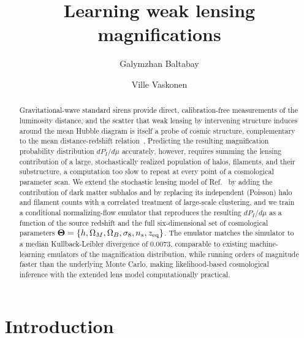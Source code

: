 \documentclass[aps,prd,10pt,nofootinbib,twocolumn,superscriptaddress,floatfix,notitlepage]{revtex4-1}
\newcommand{\vect}[1]{\boldsymbol{#1}}
\newcommand{\B}[1]{{\color{blue} #1}}
\begin{document}
\title{Learning weak lensing magnifications}

\author{Galymzhan Baltabay}

\author{Ville Vaskonen}

\begin{abstract}
Gravitational-wave standard sirens provide direct, calibration-free measurements of the luminosity distance, and the scatter that weak lensing by intervening structure induces around the mean Hubble diagram is itself a probe of cosmic structure, complementary to the mean distance-redshift relation~\cite{Vaskonen:2026ubd}. Predicting the resulting magnification probability distribution $dP_I/d\mu$ accurately, however, requires summing the lensing contribution of a large, stochastically realized population of halos, filaments, and their substructure, a computation too slow to repeat at every point of a cosmological parameter scan. We extend the stochastic lensing model of Ref.~\cite{Vaskonen:2026ubd} by adding the contribution of dark matter subhalos and by replacing its independent (Poisson) halo and filament counts with a correlated treatment of large-scale clustering, and we train a conditional normalizing-flow emulator that reproduces the resulting $dP_I/d\mu$ as a function of the source redshift and the full six-dimensional set of cosmological parameters $\vect\Theta = \{h,\Omega_M,\Omega_B,\sigma_8,n_s,z_{\rm eq}\}$. The emulator matches the simulator \B{to a median Kullback-Leibler divergence of $0.0073$, comparable to existing machine-learning emulators of the magnification distribution, while running orders of magnitude faster than the underlying Monte Carlo, making likelihood-based cosmological inference with the extended lens model computationally practical.}
\end{abstract}

\maketitle

\section{Introduction}
\end{document}
